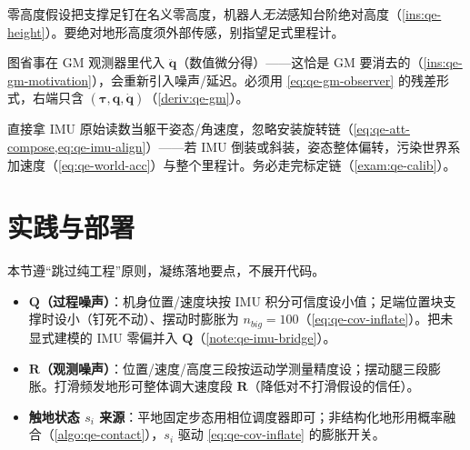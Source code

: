 \begin{pitfall}[期望零高度假设能测台阶]
零高度假设把支撑足钉在名义零高度，机器人\emph{无法}感知台阶绝对高度（\cref{ins:qe-height}）。要绝对地形高度须外部传感，别指望足式里程计。
\end{pitfall}

\begin{pitfall}[GM 观测器里偷用加速度]
图省事在 GM 观测器里代入 $\ddot{\boldsymbol q}$（数值微分得）——这恰是 GM 要消去的（\cref{ins:qe-gm-motivation}），会重新引入噪声/延迟。必须用 \cref{eq:qe-gm-observer} 的残差形式，右端只含 $(\boldsymbol\tau,\boldsymbol q,\dot{\boldsymbol q})$（\cref{deriv:qe-gm}）。
\end{pitfall}

\begin{pitfall}
直接拿 IMU 原始读数当躯干姿态/角速度，忽略安装旋转链（\cref{eq:qe-att-compose,eq:qe-imu-align}）——若 IMU 倒装或斜装，姿态整体偏转，污染世界系加速度（\cref{eq:qe-world-acc}）与整个里程计。务必走完标定链（\cref{exam:qe-calib}）。
\end{pitfall}

\section{实践与部署}
\label{sec:qe-practice}

本节遵“跳过纯工程”原则，凝练落地要点，不展开代码。

\begin{practice}
\begin{itemize}
  \item \textbf{$\mathbf{Q}$（过程噪声）}：机身位置/速度块按 IMU 积分可信度设小值；足端位置块支撑时设小（钉死不动）、摆动时膨胀为 $n_{big}=100$（\cref{eq:qe-cov-inflate}）。把未显式建模的 IMU 零偏并入 $\mathbf{Q}$（\cref{note:qe-imu-bridge}）。
  \item \textbf{$\mathbf{R}$（观测噪声）}：位置/速度/高度三段按运动学测量精度设；摆动腿三段膨胀。打滑频发地形可整体调大速度段 $\mathbf{R}$（降低对不打滑假设的信任）。
  \item \textbf{触地状态 $s_i$ 来源}：平地固定步态用相位调度器即可；非结构化地形用概率融合（\cref{algo:qe-contact}），$s_i$ 驱动 \cref{eq:qe-cov-inflate} 的膨胀开关。
\end{itemize}
\end{practice}


